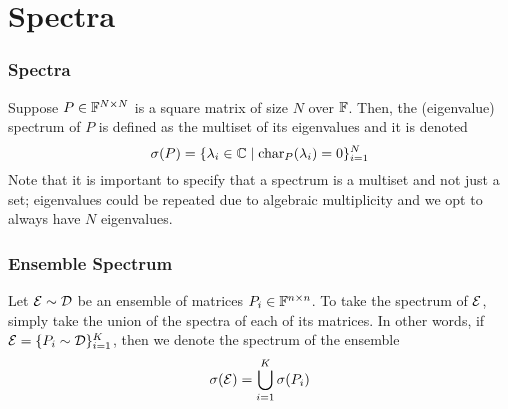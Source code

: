 

\section{Spectra}
\begin{frame} \frametitle{Spectra}

\begin{alertblock}{}
Suppose $P \in \mathbb{F}^{N \times N}$ is a square matrix of size $N$ over $\mathbb{F}$. Then, the (eigenvalue) spectrum of $P$ is defined as the multiset of its eigenvalues and it is denoted
$$\sigma(P) = \{\lambda_i \in \mathbb{C} \mid \text{char}_P(\lambda_i) = 0 \}_{i=1}^N$$
Note that it is important to specify that a spectrum is a multiset and not just a set; eigenvalues could be repeated due to algebraic multiplicity and we opt to always have $N$ eigenvalues.
\end{alertblock}

\end{frame}
\begin{frame} \frametitle{Ensemble Spectrum}

\begin{alertblock}{}
Let $\mathcal{E} \sim \mathcal{D}$ be an ensemble of matrices $P_i \in \mathbb{F}^{n \times n}$. To take the spectrum of $\mathcal{E}$, simply take the union of the spectra of each of its matrices.
In other words, if $\mathcal{E} = \{P_i \sim \mathcal{D}\}_{i = 1}^K$, then we denote the spectrum of the ensemble
$$\sigma(\mathcal{E}) = \bigcup_{i=1}^K \sigma(P_i)$$
\end{alertblock}

\end{frame}



